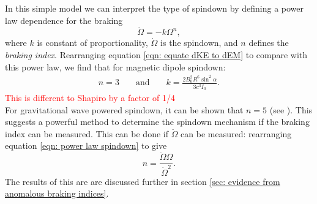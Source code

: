 In this simple model we can interpret the type of spindown by defining a power
law dependence for the braking
\begin{equation}
    \dot{\Omega} = -k \Omega^{n},
    \label{eqn: power law spindown}
\end{equation}
where $k$ is constant of proportionality, $\dot{\Omega}$ is the spindown, and
$n$ defines the \emph{braking index}. Rearranging equation 
\eqref{eqn: equate dKE to dEM} to compare with this power law, we find that for
magnetic dipole spindown:
\begin{align}
    n = 3 && \textrm{ and } && k = \frac{2B_{0}^{2}R^{6} \sin^{2}\alpha}{3 c^{3} I_{0}}.
    \label{eqn: n and k}
\end{align}
\textcolor{red}{This is different to Shapiro by a factor of 1/4}\\
For gravitational wave powered spindown, it can be shown that $n=5$
(see \citet{Shapiro83}). This suggests a powerful method to determine the spindown
mechanism if the braking index can be measured. This can be done if
$\ddot{\Omega}$ can be measured: rearranging equation \eqref{eqn: power law
spindown} to give
\begin{equation}
    n = \frac{\ddot{\Omega}\Omega}{\dot{\Omega}^{2}}.
    \label{eqn: measured braking index}
\end{equation}
The results of this are are discussed further in section \ref{sec: evidence from
    anomalous braking indices}.

